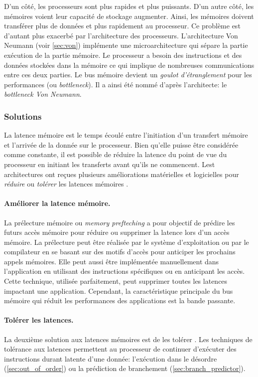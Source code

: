 D'un côté, les processeurs sont plus rapides et plus puissants. D'un autre côté, les mémoires voient leur capacité de stockage augmenter. Ainsi, les mémoires doivent transférer plus de données et plus rapidement au processeur. Ce problème est d'autant plus exacerbé par l'architecture des processeurs. L’architecture Von Neumann (voir \autoref{sec:von}) implémente une microarchitecture qui sépare la partie exécution de la partie mémoire.
Le processeur a besoin des instructions et des données stockées dans la mémoire ce qui implique de nombreuses communications entre ces deux parties. Le bus mémoire devient un \textit{goulot d'étranglement} pour les performances (ou \textit{bottleneck}). Il a ainsi été nommé d'après l'architecte: le \textit{bottleneck Von Neumann}.




\subsubsection{Solutions}
La latence mémoire est le temps écoulé entre l’initiation d’un transfert mémoire et l'arrivée de la donnée sur le processeur. Bien qu'elle puisse être considérée comme constante, il est possible de réduire la latence du point de vue du processeur en initiant les transferts avant qu'ils ne commencent.  Lest architectures ont reçues plusieurs améliorations matérielles et logicielles pour \textit{réduire} ou \textit{tolérer} les latences mémoires \cite{Efnusheva2017ASO}.



\paragraph{Améliorer la latence mémoire.} 
La prélecture mémoire \cite{baer1991effective, mowry1991tolerating} ou \textit{memory prefteching}  a pour objectif de prédire les futurs accès mémoire pour réduire ou supprimer la latence lors d'un accès mémoire. La prélecture peut être réalisée par le système d'exploitation ou par le compilateur en se basant sur des motifs d'accès pour anticiper les prochains appels mémoires. Elle peut aussi être implémentée manuellement dans l'application en utilisant des instructions spécifiques ou en anticipant les accès. Cette technique, utilisée parfaitement, peut supprimer toutes les latences impactant une application. Cependant, la caractéristique principale du bus mémoire qui réduit les performances des applications est la bande passante.

\paragraph{Tolérer les latences.}
La deuxième solution aux latences mémoires est de les tolérer \cite{Bakshi2000}. Les techniques de tolérance aux latences permettent au processeur de continuer d’exécuter des instructions durant latente d’une donnée: l’exécution dans le désordre (\autoref{sec:out_of_order}) ou la prédiction de branchement (\autoref{sec:branch_predictor}).\\


